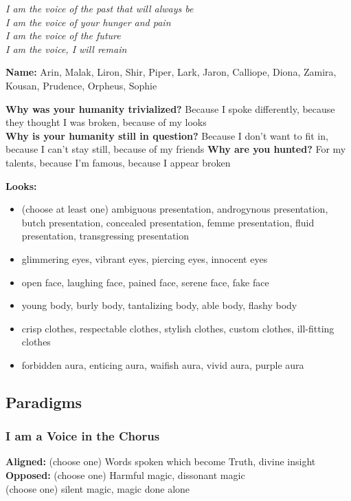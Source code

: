 \documentclass[
]{memoir}
\begin{document}
\emph{I am the voice of the past that will always be}\\
\emph{I am the voice of your hunger and pain}\\
\emph{I am the voice of the future}\\
\emph{I am the voice, I will remain}

\textbf{Name:} Arin, Malak, Liron, Shir, Piper, Lark, Jaron, Calliope,
Diona, Zamira, Kousan, Prudence, Orpheus, Sophie

\textbf{Why was your humanity trivialized?} Because I spoke differently,
because they thought I was broken, because of my looks\\
\textbf{Why is your humanity still in question?} Because I don't want to
fit in, because I can't stay still, because of my friends \textbf{Why
are you hunted?} For my talents, because I'm famous, because I appear
broken

\textbf{Looks:}

\begin{itemize}
\tightlist
\item
  (choose at least one) ambiguous presentation, androgynous
  presentation, butch presentation, concealed presentation, femme
  presentation, fluid presentation, transgressing presentation
\item
  glimmering eyes, vibrant eyes, piercing eyes, innocent eyes
\item
  open face, laughing face, pained face, serene face, fake face
\item
  young body, burly body, tantalizing body, able body, flashy body
\item
  crisp clothes, respectable clothes, stylish clothes, custom clothes,
  ill-fitting clothes
\item
  forbidden aura, enticing aura, waifish aura, vivid aura, purple aura
\end{itemize}

\hypertarget{paradigms-7}{%
\subsection{Paradigms}\label{paradigms-7}}

\hypertarget{i-am-a-voice-in-the-chorus}{%
\subsubsection{I am a Voice in the
Chorus}\label{i-am-a-voice-in-the-chorus}}

\textbf{Aligned:} (choose one) Words spoken which become Truth, divine
insight\\
\textbf{Opposed:} (choose one) Harmful magic, dissonant magic\\
(choose one) silent magic, magic done alone
\end{document}
